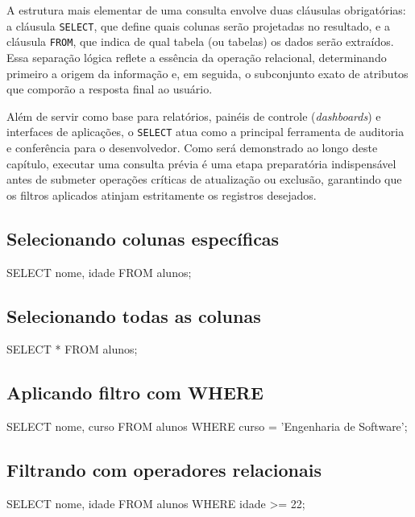 A estrutura mais elementar de uma consulta envolve duas cláusulas obrigatórias: a cláusula \texttt{SELECT}, que define quais colunas serão projetadas no resultado, e a cláusula \texttt{FROM}, que indica de qual tabela (ou tabelas) os dados serão extraídos. Essa separação lógica reflete a essência da operação relacional, determinando primeiro a origem da informação e, em seguida, o subconjunto exato de atributos que comporão a resposta final ao usuário.

Além de servir como base para relatórios, painéis de controle (\textit{dashboards}) e interfaces de aplicações, o \texttt{SELECT} atua como a principal ferramenta de auditoria e conferência para o desenvolvedor. Como será demonstrado ao longo deste capítulo, executar uma consulta prévia é uma etapa preparatória indispensável antes de submeter operações críticas de atualização ou exclusão, garantindo que os filtros aplicados atinjam estritamente os registros desejados.

\subsection{Selecionando colunas específicas}

\begin{sqlcode}
SELECT nome, idade
FROM alunos;
\end{sqlcode}

\subsection{Selecionando todas as colunas}

\begin{sqlcode}
SELECT *
FROM alunos;
\end{sqlcode}

\subsection{Aplicando filtro com WHERE}

\begin{sqlcode}
SELECT nome, curso
FROM alunos
WHERE curso = 'Engenharia de Software';
\end{sqlcode}

\subsection{Filtrando com operadores relacionais}

\begin{sqlcode}
SELECT nome, idade
FROM alunos
WHERE idade >= 22;
\end{sqlcode}

